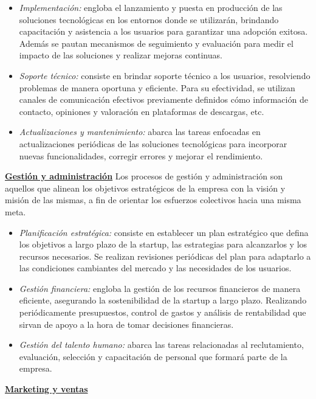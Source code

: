 \documentclass[a4paper,12pt]{article}
\begin{document}
    \begin{itemize}
        \item[] \textit{Implementación:} engloba el lanzamiento y puesta en producción de las soluciones tecnológicas en los entornos donde se utilizarán, brindando capacitación y asistencia a los usuarios para garantizar una adopción exitosa. Además se pautan mecanismos de seguimiento y evaluación para medir el impacto de las soluciones y realizar mejoras continuas.
        \item[] \textit{Soporte técnico:} consiste en brindar soporte técnico a los usuarios, resolviendo problemas de manera oportuna y eficiente. Para su efectividad, se utilizan canales de comunicación efectivos previamente definidos cómo información de contacto, opiniones y valoración en plataformas de descargas, etc.
        \item[] \textit{Actualizaciones y mantenimiento:} abarca las tareas enfocadas en actualizaciones periódicas de las soluciones tecnológicas para incorporar nuevas funcionalidades, corregir errores y mejorar el rendimiento.
    \end{itemize}
    \textbf{\underline{Gestión y administración}}
    \newline
    Los procesos de gestión y administración son aquellos que alinean los objetivos estratégicos de la empresa con la visión y misión de las mismas, a fin de orientar los esfuerzos colectivos hacia una misma meta.
    \begin{itemize}
        \item[] \textit{Planificación estratégica:} consiste en establecer un plan estratégico que defina los objetivos a largo plazo de la startup, las estrategias para alcanzarlos y los recursos necesarios. Se realizan revisiones periódicas del plan para adaptarlo a las condiciones cambiantes del mercado y las necesidades de los usuarios.
        \item[] \textit{Gestión financiera:} engloba la gestión de los recursos financieros de manera eficiente, asegurando la sostenibilidad de la startup a largo plazo. Realizando periódicamente presupuestos, control de gastos y análisis de rentabilidad que sirvan de apoyo a la hora de tomar decisiones financieras.
        \item[] \textit{Gestión del talento humano:} abarca las tareas relacionadas al reclutamiento, evaluación, selección y capacitación de personal que formará parte de la empresa.
    \end{itemize}
    \textbf{\underline{Marketing y ventas}}
\end{document}
